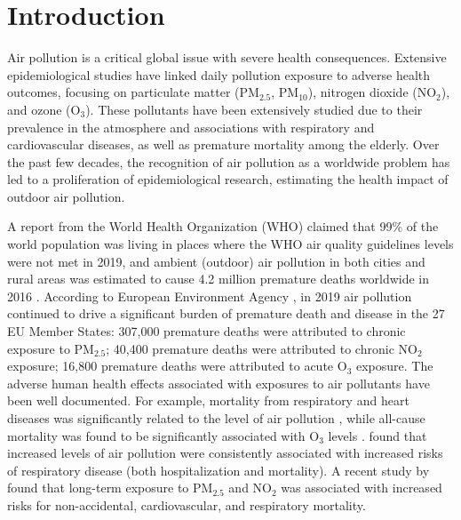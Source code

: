 \documentclass[
  12,
]{article}
\begin{document}
\hypertarget{introduction}{%
\section{Introduction}\label{introduction}}

Air pollution is a critical global issue with severe health
consequences. Extensive epidemiological studies have linked daily
pollution exposure to adverse health outcomes, focusing on particulate
matter (PM\(_{2.5}\), PM\(_{10}\)), nitrogen dioxide (NO\(_2\)), and
ozone (O\(_3\)). These pollutants have been extensively studied due to
their prevalence in the atmosphere and associations with respiratory and
cardiovascular diseases, as well as premature mortality among the
elderly. Over the past few decades, the recognition of air pollution as
a worldwide problem has led to a proliferation of epidemiological
research, estimating the health impact of outdoor air pollution.

A report from the World Health Organization (WHO) claimed that 99\% of
the world population was living in places where the WHO air quality
guidelines levels were not met in 2019, and ambient (outdoor) air
pollution in both cities and rural areas was estimated to cause 4.2
million premature deaths worldwide in 2016 \autocite{WHO2021}. According
to European Environment Agency \autocite{EEA2021}, in 2019 air pollution
continued to drive a significant burden of premature death and disease
in the 27 EU Member States: 307,000 premature deaths were attributed to
chronic exposure to PM\(_{2.5}\); 40,400 premature deaths were
attributed to chronic NO\(_2\) exposure; 16,800 premature deaths were
attributed to acute O\(_3\) exposure. The adverse human health effects
associated with exposures to air pollutants have been well documented.
For example, mortality from respiratory and heart diseases was
significantly related to the level of air pollution \autocites[see
e.g.,][]{Hoek2013,Hodgson1970}, while all-cause mortality was found to
be significantly associated with O\(_3\) levels \autocites[see
e.g.,][]{Huang2022,Anderson1996}. \textcite{Lee2020} found that
increased levels of air pollution were consistently associated with
increased risks of respiratory disease (both hospitalization and
mortality). A recent study by \textcite{Zhang2021} found that long-term
exposure to PM\(_{2.5}\) and NO\(_2\) was associated with increased
risks for non-accidental, cardiovascular, and respiratory mortality.
\end{document}
